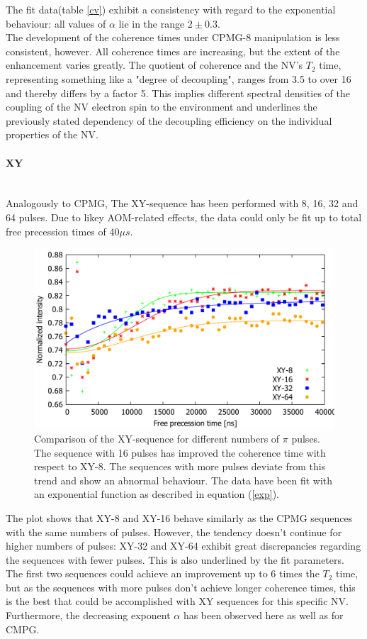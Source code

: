 \documentclass[12pt,a4paper]{article}
\begin{document}
The fit data(table \ref{cv}) exhibit a consistency with regard to the exponential behaviour: all values of $\alpha$ lie in the range $2\pm0.3$.  
\\
The development of the coherence times under CPMG-8 manipulation is less consistent, however. All coherence times are increasing, but the extent of the enhancement varies greatly. The quotient of coherence and the NV's $T_2$ time, representing something like a "degree of decoupling", ranges from 3.5 to over 16 and thereby differs by a factor 5. This implies different spectral densities of the coupling of the NV electron spin to the environment and underlines the previously stated dependency of the decoupling efficiency on the individual properties of the NV.
\paragraph{XY}\mbox{}\\
Analogously to CPMG, The XY-sequence has been performed with 8, 16, 32 and 64 pulses. Due to likey AOM-related effects, the data could only be fit up to total free precession times of 40$\mu s$.
\begin{figure}[H] 
\includegraphics[scale=0.6]{nanox.pdf} 
\caption{Comparison of the XY-sequence for different numbers of $\pi$ pulses. The sequence with 16 pulses has improved the coherence time with respect to XY-8. The sequences with more pulses deviate from this trend and show an abnormal behaviour. The data have been fit with an exponential function as described in equation (\ref{exp}).}
\label{X4}
\end{figure}
The plot shows that XY-8 and XY-16 behave similarly as the CPMG sequences with the same numbers of pulses. However, the tendency doesn't continue for higher numbers of pulses: XY-32 and XY-64 exhibit great discrepancies regarding the sequences with fewer pulses. This is also underlined by the fit parameters. The first two sequences could achieve an improvement up to 6 times the $T_2$ time, but as the sequences with more pulses don't achieve longer coherence times, this is the best that could be accomplished with XY sequences for this specific NV. Furthermore, the decreasing exponent $\alpha$ has been observed here as well as for CMPG.\\               
\end{document}
